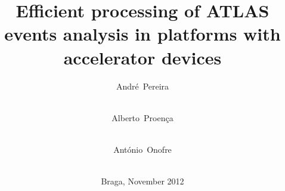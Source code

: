 \titlehead{%
%
University~of~Minho\hfill Informatics~Department%
}

\subject{Dissertation for Master's Degree in Informatics Engineering}

\author{%
André~Pereira\\\student\\%
\and Alberto~Proença\\\advisor\\%
\and António~Onofre\\\coadvisor\\%
}

\title{Efficient processing of ATLAS events analysis in platforms with accelerator devices}

\date{Braga, November 2012}
